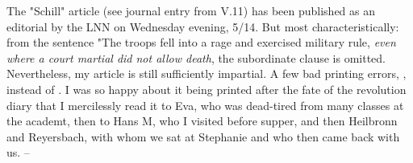 
The "Schill" article (see journal entry from V.11) has been published as an editorial by the LNN on Wednesday evening, 5/14. But most characteristically: from the sentence "The troops fell into a rage and exercised military rule, \textit{even where a court martial did not allow death}, the subordinate clause is omitted. Nevertheless, my article is still sufficiently impartial. A few bad printing errors, ,  instead of . I was so happy about it being printed after the fate of the revolution diary that I mercilessly read it to Eva, who was dead-tired from many classes at the academt, then to Hans M, who I visited before supper, and then Heilbronn and Reyersbach, with whom we sat at Stephanie and who then came back with us. -- \missing

